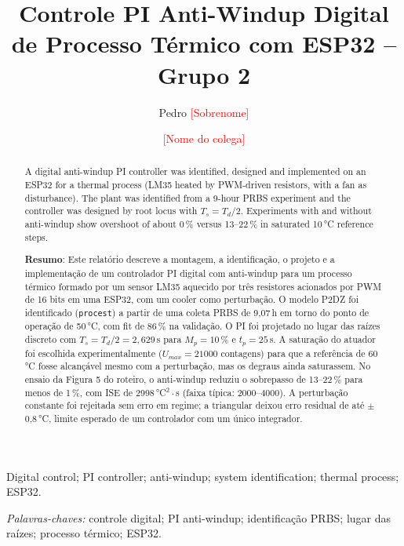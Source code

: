 \documentclass[a4paper]{ifacconf}
\newcommand{\pendente}[1]{\textcolor{red}{[#1]}}
\begin{document}

\begin{frontmatter}


\title{Controle PI Anti-Windup Digital de Processo Térmico com ESP32 -- Grupo 2}

\author[First]{Pedro \pendente{Sobrenome}}
\author[Second]{\pendente{Nome do colega}}

\address[First]{\pendente{Matrícula}, \pendente{Curso}, UnB, pviana2000@gmail.com}
\address[Second]{\pendente{Matrícula}, \pendente{Curso}, UnB, \pendente{e-mail}}

\renewcommand{\abstractname}{{\bf Abstract:~}}
\begin{abstract}
A digital anti-windup PI controller was identified, designed and implemented on an ESP32 for a
thermal process (LM35 heated by PWM-driven resistors, with a fan as disturbance). The plant was
identified from a 9-hour PRBS experiment and the controller was designed by root locus with
$T_s=T_d/2$. Experiments with and without anti-windup show overshoot of about 0\,\% versus
13--22\,\% in saturated 10\,°C reference steps.

\vskip 1mm
{\noindent \bf Resumo}: Este relatório descreve a montagem, a identificação, o projeto e a
implementação de um controlador PI digital com anti-windup para um processo térmico formado por
um sensor LM35 aquecido por três resistores acionados por PWM de 16 bits em uma ESP32, com um
cooler como perturbação. O modelo P2DZ foi identificado (\texttt{procest}) a partir de uma coleta
PRBS de 9,07\,h em torno do ponto de operação de 50\,°C, com fit de 86\,\% na validação. O PI foi
projetado no lugar das raízes discreto com $T_s=T_d/2=2{,}629$\,s para $M_p=10\,\%$ e $t_p=25$\,s.
A saturação do atuador foi escolhida experimentalmente ($U_{max}=21000$ contagens) para que a
referência de 60\,°C fosse alcançável mesmo com a perturbação, mas os degraus ainda saturassem.
No ensaio da Figura 5 do roteiro, o anti-windup reduziu o sobrepasso de 13--22\,\% para menos de
1\,\%, com ISE de 2998\,°C$^2\cdot$s (faixa típica: 2000--4000). A perturbação constante foi
rejeitada sem erro em regime; a triangular deixou erro residual de até $\pm$0,8\,°C, limite
esperado de um controlador com um único integrador.
\end{abstract}

\begin{keyword}
Digital control; PI controller; anti-windup; system identification; thermal process; ESP32.

\vskip 1mm
{\noindent\it Palavras-chaves:} controle digital; PI anti-windup; identificação PRBS; lugar das
raízes; processo térmico; ESP32.
\end{keyword}
\end{frontmatter}
\end{document}
